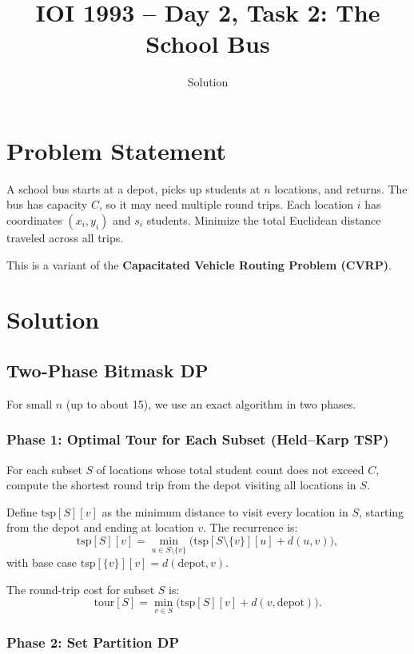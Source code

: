 \documentclass[11pt,a4paper]{article}
\title{IOI 1993 -- Day 2, Task 2: The School Bus}
\author{Solution}
\date{}
\begin{document}
\maketitle

\section{Problem Statement}

A school bus starts at a depot, picks up students at $n$ locations, and
returns. The bus has capacity $C$, so it may need multiple round trips.
Each location $i$ has coordinates $(x_i, y_i)$ and $s_i$ students. Minimize
the total Euclidean distance traveled across all trips.

This is a variant of the \textbf{Capacitated Vehicle Routing Problem (CVRP)}.

\section{Solution}

\subsection{Two-Phase Bitmask DP}

For small $n$ (up to about 15), we use an exact algorithm in two phases.

\subsubsection{Phase 1: Optimal Tour for Each Subset (Held--Karp TSP)}

For each subset $S$ of locations whose total student count does not exceed
$C$, compute the shortest round trip from the depot visiting all locations
in $S$.

Define $\text{tsp}[S][v]$ as the minimum distance to visit every location in
$S$, starting from the depot and ending at location $v$. The recurrence is:
\[
  \text{tsp}[S][v] = \min_{u \in S \setminus \{v\}}
    \bigl(\text{tsp}[S \setminus \{v\}][u] + d(u, v)\bigr),
\]
with base case $\text{tsp}[\{v\}][v] = d(\text{depot}, v)$.

The round-trip cost for subset $S$ is:
\[
  \text{tour}[S] = \min_{v \in S}
    \bigl(\text{tsp}[S][v] + d(v, \text{depot})\bigr).
\]

\subsubsection{Phase 2: Set Partition DP}
\end{document}
